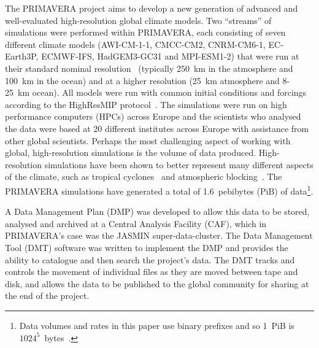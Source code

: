 \documentclass[gmd, manuscript]{copernicus}
\begin{document}


\introduction  %

The PRIMAVERA project aims to develop a new generation of advanced and well-evaluated high-resolution global climate models. Two ``streams'' of simulations were performed within PRIMAVERA, each consisting of seven different climate models (AWI-CM-1-1, CMCC-CM2, CNRM-CM6-1, EC-Earth3P, ECMWF-IFS, HadGEM3-GC31 and MPI-ESM1-2) that were run at their standard nominal resolution~\citep{GloablAttr} (typically  250~km in the atmosphere and 100~km in the ocean) and at a higher resolution (25~km atmosphere and 8-25~km ocean). All models were run with common initial conditions and forcings according to the HighResMIP protocol~\citep{Haarsma2016}. The simulations were run on high performance computers (HPCs) across Europe and the scientists who analysed the data were based at 20 different institutes across Europe with assistance from other global scientists. Perhaps the most challenging aspect of working with global, high-resolution simulations is the volume of data produced. High-resolution simulations have been shown to better represent many different aspects of the climate, such as tropical cyclones~\citep{Roberts2020} and atmospheric blocking~\citep{Schiemann2019}. The PRIMAVERA simulations have generated a total of 1.6~pebibytes (PiB) of data\footnote{Data volumes and rates in this paper use binary prefixes and so 1~PiB is $1024^5$~bytes~\citep{IEEE1541}.}.

A Data Management Plan (DMP) was developed to allow this data to be stored, analysed and archived at a Central Analysis Facility (CAF), which in PRIMAVERA's case was the JASMIN super-data-cluster. The Data Management Tool (DMT) software was written to implement the DMP and provides the ability to catalogue and then search the project's data. The DMT tracks and controls the movement of individual files as they are moved between tape and disk, and allows the data to be published to the global community for sharing at the end of the project.
\end{document}
